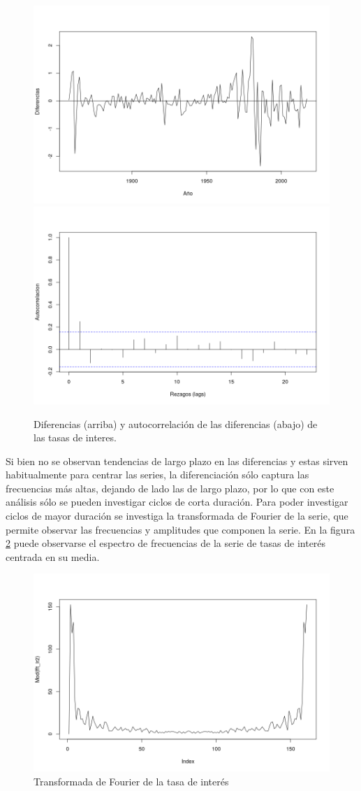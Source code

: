 \documentclass[a4paper]{article}
\begin{document}
\begin{figure}[H]
	\centering
	\includegraphics[width=0.75\linewidth]{ir_diff.png}
	\includegraphics[width=0.75\linewidth]{ir_diff_acf.png}
	\caption{Diferencias (arriba) y autocorrelación de las diferencias (abajo) de las tasas de interes.} 	
	\label{fig:ir_diff_acf}
\end{figure}

Si bien no se observan tendencias de largo plazo en las diferencias y estas sirven habitualmente para centrar las series, la diferenciación sólo captura las frecuencias más altas, dejando de lado las de largo plazo, por lo que con este análisis sólo se pueden investigar ciclos de corta duración. Para poder investigar ciclos de mayor duración se investiga la transformada de Fourier de la serie, que permite observar las frecuencias y amplitudes que componen la serie. En la figura \ref{fig:ir_fft} puede observarse el espectro de frecuencias de la serie de tasas de interés centrada en su media.

\begin{figure}[H]
	\centering
	\includegraphics[width=0.8\linewidth]{ir_fft.png}
	\caption{Transformada de Fourier de la tasa de interés} 	
	\label{fig:ir_fft}
\end{figure}
\end{document}
